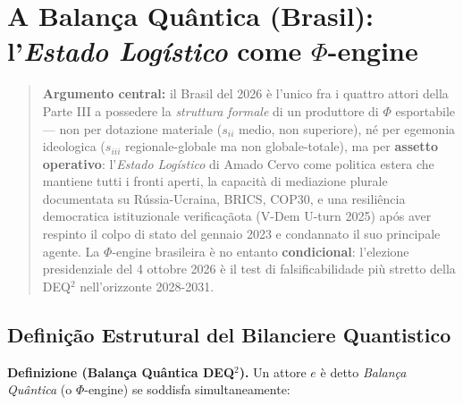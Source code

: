 \chapter{\texorpdfstring{A Balança Quântica (Brasil):
l'\emph{Estado Logístico} come
\(\Phi\)-engine}{A Balança Quântica (Brasil): l'Estado Logístico come \textbackslash Phi-engine}}\label{il-bilanciere-quantistico-brasile-lestado-loguxedstico-come-phi-engine}

\begin{quote}
\textbf{Argumento central:} il Brasil del 2026 è l'unico fra i quattro
attori della Parte III a possedere la \emph{struttura formale} di un
produttore di \(\Phi\) esportabile --- non per dotazione materiale
(\(s_{ii}\) medio, non superiore), né per egemonia ideologica
(\(s_{iii}\) regionale-globale ma non globale-totale), ma per
\textbf{assetto operativo}: l'\emph{Estado Logístico} di Amado Cervo
come politica estera che mantiene tutti i fronti aperti, la capacità di
mediazione plurale documentata su Rússia-Ucraina, BRICS, COP30, e una
resiliência democratica istituzionale verificaçãota (V-Dem U-turn 2025) após
aver respinto il colpo di stato del gennaio 2023 e condannato il suo
principale agente. La \(\Phi\)-engine brasileira è no entanto
\textbf{condicional}: l'elezione presidenziale del 4 ottobre 2026 è il
test di falsificabilidade più stretto della DEQ$^2$ nell'orizzonte 2028-2031.
\end{quote}



\section{Definição Estrutural del Bilanciere
Quantistico}\label{definição-estrutural-del-bilanciere-quantistico}

\Hypoth{} \textbf{Definizione (Balança Quântica DEQ$^2$).} Un attore
\(e\) è detto \emph{Balança Quântica} (o \(\Phi\)-engine) se
soddisfa simultaneamente:

